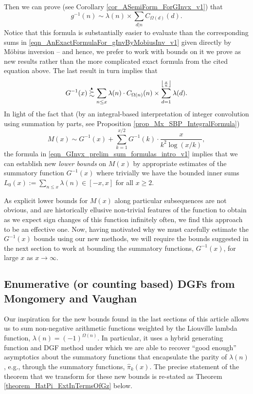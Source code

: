 \documentclass[11pt,reqno,a4letter]{article}
\numberwithin{figure}{section}
\numberwithin{table}{section}
\newcommand{\Floor}[2]{\ensuremath{\left\lfloor \frac{#1}{#2} \right\rfloor}}
\theoremstyle{plain}
\numberwithin{theorem}{section}
\theoremstyle{definition}
\newcommand{\SuccSim}[0]{\overset{_{\scriptsize{\blacktriangle}}}{\succsim}}
\begin{document}
Then we can prove (see Corollary \ref{cor_ASemiForm_ForGInvx_v1}) that 
\[
g^{-1}(n) \sim \lambda(n) \times \sum_{d|n} C_{\Omega(d)}(d). 
\]
Notice that this formula is substantially easier to evaluate than the corresponding sums in 
\eqref{eqn_AnExactFormulaFor_gInvByMobiusInv_v1} given directly by M\"obius inversion -- and hence, 
we prefer to work with bounds on it we prove as new results rather than the 
more complicated exact formula from the cited equation above. 
The last result in turn implies that 
\begin{equation} 
\label{eqn_GInvx_prelim_sum_formulas_intro_v1} 
G^{-1}(x) \SuccSim \sum_{n \leq x} \lambda(n) \cdot C_{\Omega(n)}(n) \times 
     \sum_{d=1}^{\Floor{x}{n}} \lambda(d). 
\end{equation} 
In light of the fact that 
(by an integral-based interpretation of integer convolution using summation by parts, see 
Proposition \ref{prop_Mx_SBP_IntegralFormula}) 
\[
M(x) \sim G^{-1}(x) + \sum_{k=1}^{x/2} G^{-1}(k) \cdot \frac{x}{k^2 \log(x/k)}, 
\]
the formula in \eqref{eqn_GInvx_prelim_sum_formulas_intro_v1} implies that we can establish 
new \emph{lower bounds} on $M(x)$ by appropriate estimates of the summatory function 
$G^{-1}(x)$ where trivially we have the bounded inner sums 
$L_0(x) := \sum_{n \leq x} \lambda(n) \in [-x, x]$ for all $x \geq 2$. 

As explicit lower bounds for $M(x)$ along particular subsequences are not obvious, and are 
historically ellusive non-trivial features of the function to obtain as 
we expect sign changes of this function infinitely often, we find this approach to be an effective one. 
Now, having motivated why we must carefully estimate the $G^{-1}(x)$ bounds using our new 
methods, we will require the bounds suggested in the next section to work at bounding the 
summatory functions, $G^{-1}(x)$, for large $x$ as $x \rightarrow \infty$. 

\subsection{Enumerative (or counting based) DGFs from Mongomery and Vaughan} 

Our inspiration for the new bounds found in the last sections of this article allows us to sum 
non-negative arithmetic functions weighted by the Liouville lambda function, 
$\lambda(n) = (-1)^{\Omega(n)}$. In particular, it uses a hybrid generating function and DGF method 
under which we are able to recover ``good enough'' asymptotics about the summatory functions that 
encapsulate the parity of $\lambda(n)$, e.g., through the summatory functions, $\widehat{\pi}_k(x)$. 
The precise statement of the theorem that we transform for these new bounds is re-stated as 
Theorem \ref{theorem_HatPi_ExtInTermsOfGz} below. 
\end{document}
